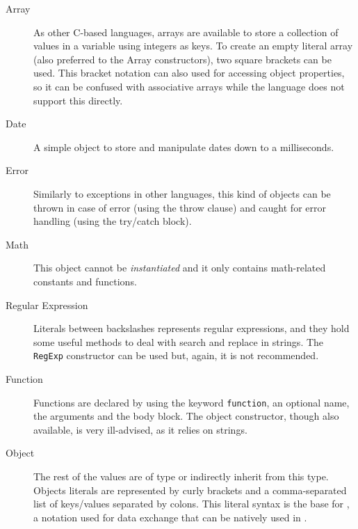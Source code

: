 \begin{description}
  \item[Array] As other C-based languages, arrays are available to store a collection of values in a variable using integers as keys.
  To create an empty literal array (also preferred to the Array constructors), two square brackets can be used.
  This bracket notation can also used for accessing object properties, so it can be confused with associative arrays while the language does not support this directly.
  \item[Date] A simple object to store and manipulate dates down to a milliseconds.
  \item[Error] Similarly to exceptions in other languages, this kind of objects can be thrown in case of error (using the throw clause) and caught for error handling (using the try/catch block).
  \item[Math] This object cannot be \emph{instantiated} and it only contains math-related constants and functions.
  \item[Regular Expression] Literals between backslashes represents regular expressions, and they hold some useful methods to deal with search and replace in strings.
  The \texttt{RegExp} constructor can be used but, again, it is not recommended.
  \item[Function] Functions are declared by using the keyword \texttt{function}, an optional name, the arguments and the body block.
  The object constructor, though also available, is very ill-advised, as it relies on strings.
  \item[Object] The rest of the values are of type  or indirectly inherit from this type.
  Objects literals are represented by curly brackets and a comma-separated list of keys/values separated by colons.
  This literal syntax is the base for , a notation used for data exchange that can be natively used in .
\end{description}

